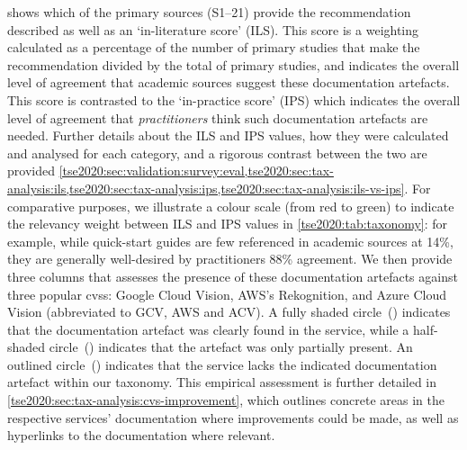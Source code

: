  shows which of the primary sources (S1--21) provide the recommendation described as well as an `in-literature score' (ILS). This score is a weighting calculated as a percentage of the number of primary studies that make the recommendation divided by the total of primary studies, and indicates the overall level of agreement that academic sources suggest these documentation artefacts. This score is contrasted to the `in-practice score' (IPS) which indicates the overall level of agreement that \textit{practitioners} think such documentation artefacts are needed. Further details about the ILS and IPS values, how they were calculated and analysed for each category, and a rigorous contrast between the two are provided \cref{tse2020:sec:validation:survey:eval,tse2020:sec:tax-analysis:ils,tse2020:sec:tax-analysis:ips,tse2020:sec:tax-analysis:ils-vs-ips}. For comparative purposes, we illustrate a colour scale (from red to green) to indicate the relevancy weight between ILS and IPS values in \cref{tse2020:tab:taxonomy}: for example, while quick-start guides  are few referenced in academic sources at 14\%, they are generally well-desired by practitioners 88\% agreement. We then provide three columns that assesses the presence of these documentation artefacts against three popular \glspl{cvs}: Google Cloud Vision, AWS's Rekognition, and Azure Cloud Vision (abbreviated to GCV, AWS and ACV). A fully shaded circle~(\circlepresent{}) indicates that the documentation artefact was clearly found in the service, while a half-shaded circle~(\circlepartialpresent{}) indicates that the artefact was only partially present. An outlined circle~(\circlenotpresent{}) indicates that the service lacks the indicated documentation artefact within our taxonomy. This empirical assessment is further detailed in \cref{tse2020:sec:tax-analysis:cvs-improvement}, which outlines concrete areas in the respective services' documentation where improvements could be made, as well as hyperlinks to the documentation where relevant. 

